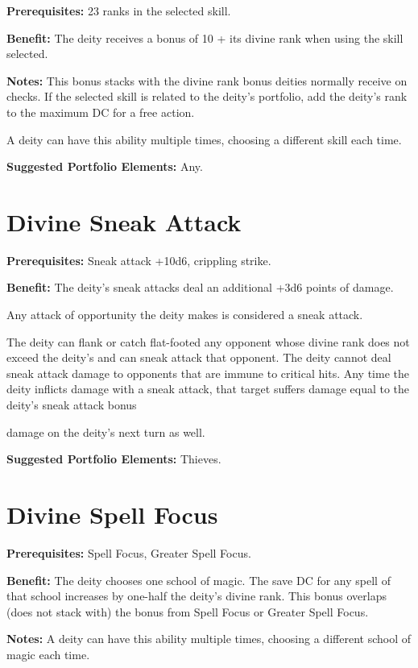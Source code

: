 \documentclass{article}
\begin{document}
\textbf{Prerequisites:} 23 ranks in the selected skill.

\textbf{Benefit:} The deity receives a bonus of 10 + its divine rank when using 
the skill selected.

\textbf{Notes:} This bonus stacks with the divine rank bonus deities normally receive 
on checks. If the selected skill is related to the deity's portfolio, add the deity's 
rank to the maximum DC for a free action.

A deity can have this ability multiple times, choosing a different skill each time.

\textbf{Suggested Portfolio Elements:} Any.

\vspace{12pt}
\section*{Divine Sneak Attack}

\textbf{Prerequisites:} Sneak attack +10d6, crippling strike.

\textbf{Benefit:} The deity's sneak attacks deal an additional +3d6 points of damage.

Any attack of opportunity the deity makes is considered a sneak attack.

The deity can flank or catch flat-footed any opponent whose divine rank does not 
exceed the deity's and can sneak attack that opponent. The deity cannot deal sneak 
attack damage to opponents that are immune to critical hits. Any time the deity 
inflicts damage with a sneak attack, that target suffers damage equal to the deity's 
sneak attack bonus

damage on the deity's next turn as well. 

\textbf{Suggested Portfolio Elements:} Thieves.

\vspace{12pt}
\section*{Divine Spell Focus}

\textbf{Prerequisites:} Spell Focus, Greater Spell Focus.

\textbf{Benefit:} The deity chooses one school of magic. The save DC for any spell 
of that school increases by one-half the deity's divine rank. This bonus overlaps 
(does not stack with) the bonus from Spell Focus or Greater Spell Focus.

\textbf{Notes:} A deity can have this ability multiple times, choosing a different 
school of magic each time.
\end{document}
